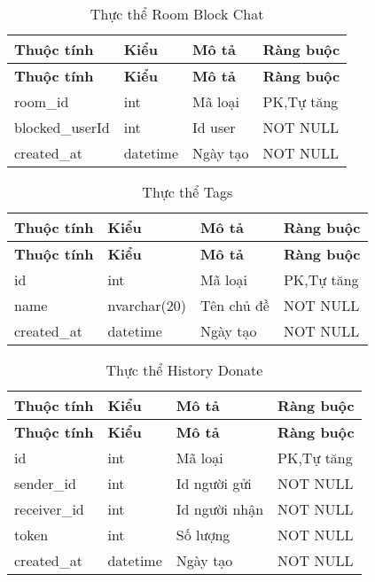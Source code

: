 \begin{center}
\begin{longtabu} to 
\caption{Thực thể Room Block Chat} \\
   \hline \textbf{Thuộc tính}  & \textbf{Kiểu} & \textbf{Mô tả} & \textbf{Ràng buộc} \\ \hline
   \endfirsthead
   \hline \textbf{Thuộc tính}  & \textbf{Kiểu} & \textbf{Mô tả} & \textbf{Ràng buộc} \\ \hline
   \endhead
      room\_id & int & Mã loại  & PK,Tự tăng
      \\ \hline
      blocked\_userId & int & Id user & NOT NULL
      \\ \hline
      created\_at & datetime & Ngày tạo & NOT NULL
      \\ \hline
\end{longtabu}
\end{center}

\begin{center}
\begin{longtabu} to 
\caption{Thực thể Tags} \\
   \hline \textbf{Thuộc tính}  & \textbf{Kiểu} & \textbf{Mô tả} & \textbf{Ràng buộc} \\ \hline
   \endfirsthead
   \hline \textbf{Thuộc tính}  & \textbf{Kiểu} & \textbf{Mô tả} & \textbf{Ràng buộc} \\ \hline
   \endhead
      id & int  & Mã loại & PK,Tự tăng
      \\ \hline
      name & nvarchar(20) & Tên chủ đề & NOT NULL 
      \\ \hline
      created\_at & datetime & Ngày tạo & NOT NULL
      \\ \hline
\end{longtabu}
\end{center}

\begin{center}
\begin{longtabu} to 
\caption{Thực thể History Donate} \\
   \hline \textbf{Thuộc tính}  & \textbf{Kiểu} & \textbf{Mô tả} & \textbf{Ràng buộc} \\ \hline
   \endfirsthead
   \hline \textbf{Thuộc tính}  & \textbf{Kiểu} & \textbf{Mô tả} & \textbf{Ràng buộc} \\ \hline
   \endhead
      id & int  & Mã loại & PK,Tự tăng
      \\ \hline
      sender\_id & int & Id người gửi & NOT NULL 
      \\ \hline
      receiver\_id & int & Id người nhận  & NOT NULL 
      \\ \hline
      token & int & Số lượng  & NOT NULL
      \\ \hline
      created\_at & datetime & Ngày tạo & NOT NULL
      \\ \hline
\end{longtabu}
\end{center}

